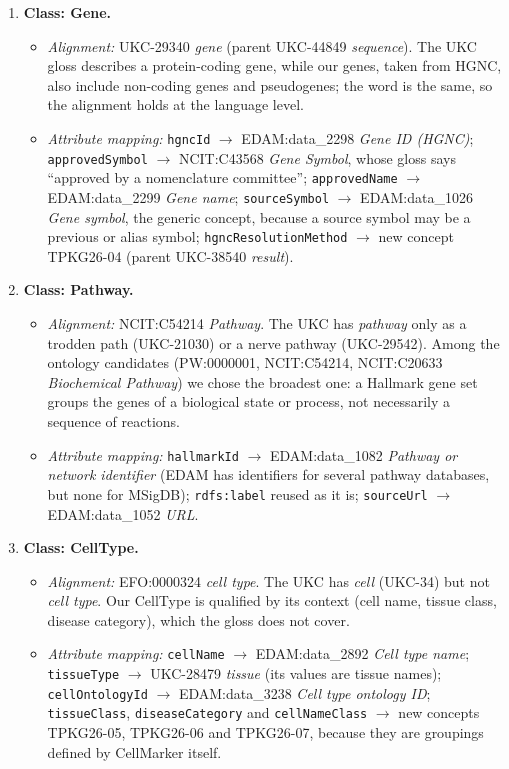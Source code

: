 \begin{enumerate}
    \item \textbf{Class: Gene.}
    \begin{itemize}
        \item \emph{Alignment:} UKC-29340 \emph{gene} (parent UKC-44849 \emph{sequence}). The UKC gloss describes a protein-coding gene, while our genes, taken from HGNC, also include non-coding genes and pseudogenes; the word is the same, so the alignment holds at the language level.
        \item \emph{Attribute mapping:} \texttt{hgncId} $\rightarrow$ EDAM:data\_2298 \emph{Gene ID (HGNC)}; \texttt{approvedSymbol} $\rightarrow$ NCIT:C43568 \emph{Gene Symbol}, whose gloss says ``approved by a nomenclature committee''; \texttt{approvedName} $\rightarrow$ EDAM:data\_2299 \emph{Gene name}; \texttt{sourceSymbol} $\rightarrow$ EDAM:data\_1026 \emph{Gene symbol}, the generic concept, because a source symbol may be a previous or alias symbol; \texttt{hgncResolutionMethod} $\rightarrow$ new concept TPKG26-04 (parent UKC-38540 \emph{result}).
    \end{itemize}
    \item \textbf{Class: Pathway.}
    \begin{itemize}
        \item \emph{Alignment:} NCIT:C54214 \emph{Pathway}. The UKC has \emph{pathway} only as a trodden path (UKC-21030) or a nerve pathway (UKC-29542). Among the ontology candidates (PW:0000001, NCIT:C54214, NCIT:C20633 \emph{Biochemical Pathway}) we chose the broadest one: a Hallmark gene set groups the genes of a biological state or process, not necessarily a sequence of reactions.
        \item \emph{Attribute mapping:} \texttt{hallmarkId} $\rightarrow$ EDAM:data\_1082 \emph{Pathway or network identifier} (EDAM has identifiers for several pathway databases, but none for MSigDB); \texttt{rdfs:label} reused as it is; \texttt{sourceUrl} $\rightarrow$ EDAM:data\_1052 \emph{URL}.
    \end{itemize}
    \item \textbf{Class: CellType.}
    \begin{itemize}
        \item \emph{Alignment:} EFO:0000324 \emph{cell type}. The UKC has \emph{cell} (UKC-34) but not \emph{cell type}. Our CellType is qualified by its context (cell name, tissue class, disease category), which the gloss does not cover.
        \item \emph{Attribute mapping:} \texttt{cellName} $\rightarrow$ EDAM:data\_2892 \emph{Cell type name}; \texttt{tissueType} $\rightarrow$ UKC-28479 \emph{tissue} (its values are tissue names); \texttt{cellOntologyId} $\rightarrow$ EDAM:data\_3238 \emph{Cell type ontology ID}; \texttt{tissueClass}, \texttt{diseaseCategory} and \texttt{cellNameClass} $\rightarrow$ new concepts TPKG26-05, TPKG26-06 and TPKG26-07, because they are groupings defined by CellMarker itself.

\end{itemize}
\end{enumerate}
